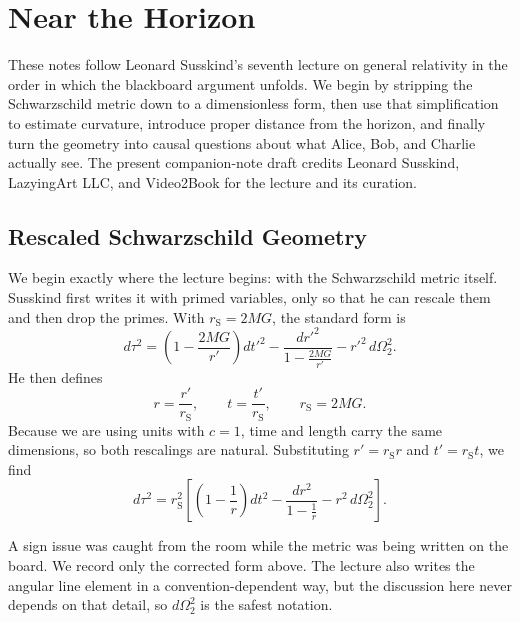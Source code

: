 \chapter{Near the Horizon}

These notes follow Leonard Susskind's seventh lecture on general relativity in the order in which the blackboard argument unfolds. We begin by stripping the Schwarzschild metric down to a dimensionless form, then use that simplification to estimate curvature, introduce proper distance from the horizon, and finally turn the geometry into causal questions about what Alice, Bob, and Charlie actually see. The present companion-note draft credits Leonard Susskind, LazyingArt LLC, and Video2Book for the lecture and its curation.

\section{Rescaled Schwarzschild Geometry}

We begin exactly where the lecture begins: with the Schwarzschild metric itself. Susskind first writes it with primed variables, only so that he can rescale them and then drop the primes. With \(r_{\mathrm S}=2MG\), the standard form is
\begin{equation}
d\tau^2
=
\left(1-\frac{2MG}{r'}\right)dt'^2
-
\frac{dr'^2}{1-\frac{2MG}{r'}}
-
r'^2\,d\Omega_2^2.
\end{equation}
He then defines
\begin{equation}
r=\frac{r'}{r_{\mathrm S}},
\qquad
t=\frac{t'}{r_{\mathrm S}},
\qquad
r_{\mathrm S}=2MG.
\end{equation}
Because we are using units with \(c=1\), time and length carry the same dimensions, so both rescalings are natural. Substituting \(r'=r_{\mathrm S}r\) and \(t'=r_{\mathrm S}t\), we find
\begin{equation}
d\tau^2
=
r_{\mathrm S}^2
\left[
\left(1-\frac{1}{r}\right)dt^2
-
\frac{dr^2}{1-\frac{1}{r}}
-
r^2\,d\Omega_2^2
\right].
\end{equation}

\begin{remark}
A sign issue was caught from the room while the metric was being written on the board. We record only the corrected form above. The lecture also writes the angular line element in a convention-dependent way, but the discussion here never depends on that detail, so \(d\Omega_2^2\) is the safest notation.
\end{remark}

